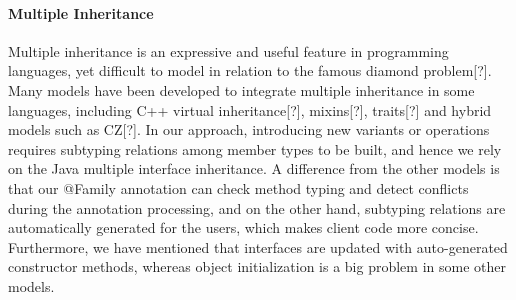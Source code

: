 

\paragraph{Multiple Inheritance}

Multiple inheritance is an expressive and useful feature in programming languages, yet difficult to model in relation to the famous diamond problem[?].
Many models have been developed to integrate multiple inheritance in some languages, including C++ virtual inheritance[?], mixins[?], traits[?] and
hybrid models such as CZ[?]. In our approach, introducing new variants or operations requires subtyping relations among member types to be built, and
hence we rely on the Java multiple interface inheritance. A difference from the other models is that our \textsf{@Family} annotation can check method
typing and detect conflicts during the annotation processing, and on the other hand, subtyping relations are automatically generated for the users, which
makes client code more concise. Furthermore, we have mentioned that interfaces are updated with auto-generated constructor methods, whereas object initialization is a big problem in some other models.
